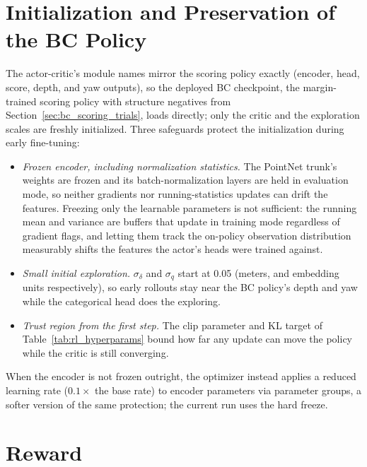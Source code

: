 \section{Initialization and Preservation of the BC Policy}
\label{sec:rl_init}

The actor-critic's module names mirror the scoring policy exactly
(encoder, head, score, depth, and yaw outputs), so the deployed BC
checkpoint, the margin-trained scoring policy with structure negatives from
Section~\ref{sec:bc_scoring_trials}, loads directly; only the critic and the
exploration scales are freshly initialized. Three safeguards protect the
initialization during early fine-tuning:

\begin{itemize}
\item \emph{Frozen encoder, including normalization statistics.} The
PointNet trunk's weights are frozen and its batch-normalization layers are
held in evaluation mode, so neither gradients nor running-statistics updates
can drift the features. Freezing only the learnable parameters is not
sufficient: the running mean and variance are buffers that update in
training mode regardless of gradient flags, and letting them track the
on-policy observation distribution measurably shifts the features the
actor's heads were trained against.
\item \emph{Small initial exploration.} $\sigma_\delta$ and $\sigma_q$ start
at 0.05 (meters, and embedding units respectively), so early rollouts stay
near the BC policy's depth and yaw while the categorical head does the
exploring.
\item \emph{Trust region from the first step.} The clip parameter and KL
target of Table~\ref{tab:rl_hyperparams} bound how far any update can move
the policy while the critic is still converging.
\end{itemize}

When the encoder is not frozen outright, the optimizer instead applies a
reduced learning rate ($0.1\times$ the base rate) to encoder parameters via
parameter groups, a softer version of the same protection; the current run
uses the hard freeze.

\section{Reward}
\label{sec:rl_reward}

